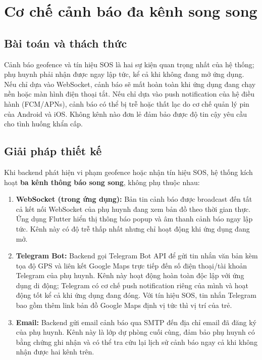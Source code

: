 \documentclass[../DoAn.tex]{subfiles}
\begin{document}
\section{Cơ chế cảnh báo đa kênh song song}
\label{section:5.4}

\subsection{Bài toán và thách thức}

Cảnh báo geofence và tín hiệu SOS là hai sự kiện quan trọng nhất của hệ thống; phụ huynh phải nhận được ngay lập tức, kể cả khi không đang mở ứng dụng. Nếu chỉ dựa vào WebSocket, cảnh báo sẽ mất hoàn toàn khi ứng dụng đang chạy nền hoặc màn hình điện thoại tắt. Nếu chỉ dựa vào push notification của hệ điều hành (FCM/APNs), cảnh báo có thể bị trễ hoặc thất lạc do cơ chế quản lý pin của Android và iOS. Không kênh nào đơn lẻ đảm bảo được độ tin cậy yêu cầu cho tình huống khẩn cấp.

\subsection{Giải pháp thiết kế}

Khi backend phát hiện vi phạm geofence hoặc nhận tín hiệu SOS, hệ thống kích hoạt \textbf{ba kênh thông báo song song}, không phụ thuộc nhau:

\begin{enumerate}
    \item \textbf{WebSocket (trong ứng dụng):} Bản tin cảnh báo được broadcast đến tất cả kết nối WebSocket của phụ huynh đang xem bản đồ theo thời gian thực. Ứng dụng Flutter hiển thị thông báo popup và âm thanh cảnh báo ngay lập tức. Kênh này có độ trễ thấp nhất nhưng chỉ hoạt động khi ứng dụng đang mở.

    \item \textbf{Telegram Bot:} Backend gọi Telegram Bot API để gửi tin nhắn văn bản kèm tọa độ GPS và liên kết Google Maps trực tiếp đến số điện thoại/tài khoản Telegram của phụ huynh. Kênh này hoạt động hoàn toàn độc lập với ứng dụng di động; Telegram có cơ chế push notification riêng của mình và hoạt động tốt kể cả khi ứng dụng đang đóng. Với tín hiệu SOS, tin nhắn Telegram bao gồm thêm link bản đồ Google Maps định vị tức thì vị trí của trẻ.

    \item \textbf{Email:} Backend gửi email cảnh báo qua SMTP đến địa chỉ email đã đăng ký của phụ huynh. Kênh này là lớp dự phòng cuối cùng, đảm bảo phụ huynh có bằng chứng ghi nhận và có thể tra cứu lại lịch sử cảnh báo ngay cả khi không nhận được hai kênh trên.
\end{enumerate}
\end{document}
